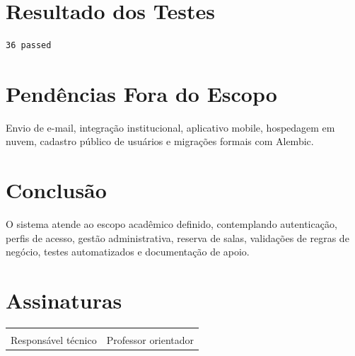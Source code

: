 \documentclass[12pt,a4paper]{article}
\begin{document}
\section{Resultado dos Testes}
\begin{verbatim}
36 passed
\end{verbatim}

\section{Pendências Fora do Escopo}
Envio de e-mail, integração institucional, aplicativo mobile, hospedagem em nuvem, cadastro público de usuários e migrações formais com Alembic.

\section{Conclusão}
O sistema atende ao escopo acadêmico definido, contemplando autenticação, perfis de acesso, gestão administrativa, reserva de salas, validações de regras de negócio, testes automatizados e documentação de apoio.

\section{Assinaturas}
\vspace{1.5cm}
\begin{center}
\begin{tabular}{p{7cm}p{7cm}}
\hrulefill & \hrulefill \\
Responsável técnico & Professor orientador \\
\end{tabular}
\end{center}
\end{document}
